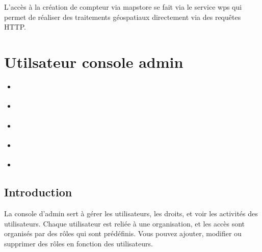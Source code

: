 \documentclass[letterpaper,10pt,french]{sphinxmanual}
\let\sphinxpxdimen\pdfpxdimen\else\newdimen\sphinxpxdimen
\begin{document}
\noindent{\hspace*{\fill}\sphinxincludegraphics[width=700\sphinxpxdimen]{{services}.png}\hspace*{\fill}}

\sphinxAtStartPar
L’accès à la création de compteur via mapstore se fait via le service wps qui permet de réaliser des traitements géospatiaux directement via des requêtes HTTP.

\sphinxstepscope


\section{Utilsateur \sphinxhyphen{} console admin}
\label{\detokenize{doc_admin/utilisateurs:utilsateur-console-admin}}\label{\detokenize{doc_admin/utilisateurs::doc}}\label{\detokenize{doc_admin/utilisateurs:utilisateur}}
\begin{sphinxShadowBox}
\begin{itemize}
\item {} 
\sphinxAtStartPar
{}\label{\detokenize{doc_admin/utilisateurs:id1}}{\hyperref[\detokenize{doc_admin/utilisateurs:introduction}]{}}

\item {} 
\sphinxAtStartPar
{}\label{\detokenize{doc_admin/utilisateurs:id2}}{\hyperref[\detokenize{doc_admin/utilisateurs:utilisateurs}]{}}

\item {} 
\sphinxAtStartPar
{}\label{\detokenize{doc_admin/utilisateurs:id3}}{\hyperref[\detokenize{doc_admin/utilisateurs:organismes}]{}}

\item {} 
\sphinxAtStartPar
{}\label{\detokenize{doc_admin/utilisateurs:id4}}{\hyperref[\detokenize{doc_admin/utilisateurs:roles}]{}}

\item {} 
\sphinxAtStartPar
{}\label{\detokenize{doc_admin/utilisateurs:id5}}{\hyperref[\detokenize{doc_admin/utilisateurs:autres}]{}}

\end{itemize}
\end{sphinxShadowBox}


\subsection{Introduction}
\label{\detokenize{doc_admin/utilisateurs:introduction}}
\sphinxAtStartPar
La console d’admin sert à gérer les utilisateurs, les droits, et voir les activités des utilisateurs.
Chaque utilisateur est reliée à une organisation, et les accès sont organisés par des rôles qui sont prédéfinis.
Vous pouvez ajouter, modifier ou supprimer des rôles en fonction des utilisateurs.
\end{document}
